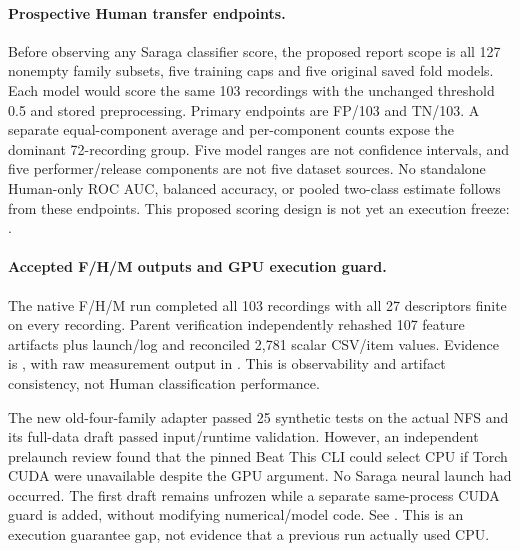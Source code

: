 \paragraph{Prospective Human transfer endpoints.}
Before observing any Saraga classifier score, the proposed report scope is
all 127 nonempty family subsets, five training caps and five original saved
fold models. Each model would score the same 103 recordings with the unchanged
threshold 0.5 and stored preprocessing. Primary endpoints are FP/103 and
TN/103. A separate equal-component average and per-component counts expose
the dominant 72-recording group. Five model ranges are not confidence
intervals, and five performer/release components are not five dataset sources.
No standalone Human-only ROC AUC, balanced accuracy, or pooled two-class
estimate follows from these endpoints. This proposed scoring design is not
yet an execution freeze: .

\paragraph{Accepted F/H/M outputs and GPU execution guard.}
The native F/H/M run completed all 103 recordings with all 27 descriptors
finite on every recording. Parent verification independently rehashed 107
feature artifacts plus launch/log and reconciled 2,781 scalar CSV/item values.
Evidence is , with raw
measurement output in . This is
observability and artifact consistency, not Human classification performance.

The new old-four-family adapter passed 25 synthetic tests on the actual NFS
and its full-data draft passed input/runtime validation. However, an independent
prelaunch review found that the pinned Beat This CLI could select CPU if Torch
CUDA were unavailable despite the GPU argument. No Saraga neural launch had
occurred. The first draft remains unfrozen while a separate same-process CUDA
guard is added, without modifying numerical/model code. See
. This is an execution
guarantee gap, not evidence that a previous run actually used CPU.

